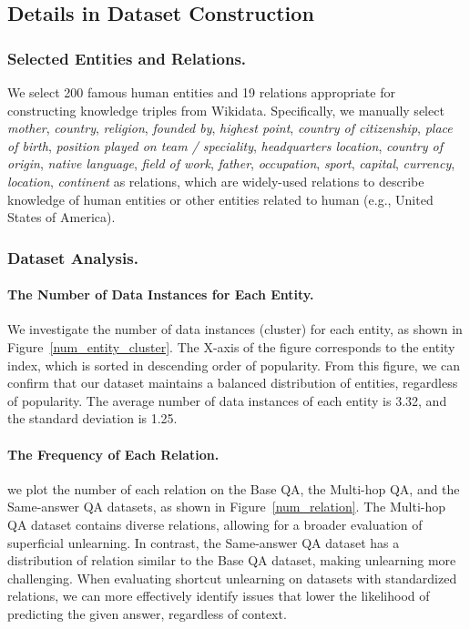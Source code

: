 





\subsection{Details in Dataset Construction}



\subsubsection{Selected Entities and Relations.}
\label{apx:relations}
We select 200 famous human entities and 19 relations appropriate for constructing knowledge triples from Wikidata.
Specifically, we manually select \textit{mother}, \textit{country}, \textit{religion}, \textit{founded by}, \textit{highest point}, \textit{country of citizenship}, \textit{place of birth}, \textit{position played on team / speciality}, \textit{headquarters location}, \textit{country of origin}, \textit{native language}, \textit{field of work}, \textit{father}, \textit{occupation}, \textit{sport}, \textit{capital}, \textit{currency}, \textit{location}, \textit{continent} as relations, which are widely-used relations to describe knowledge of human entities or other entities related to human (e.g., United States of America).


\subsubsection{Dataset Analysis.}

\paragraph{The Number of Data Instances for Each Entity.}
We investigate the number of data instances (cluster) for each entity, as shown in Figure~\ref{num_entity_cluster}.
The X-axis of the figure corresponds to the entity index, which is sorted in descending order of popularity.
From this figure, we can confirm that our dataset maintains a balanced distribution of entities, regardless of popularity.
The average number of data instances of each entity is 3.32, and the standard deviation is 1.25.




\paragraph{The Frequency of Each Relation.}
we plot the number of each relation on the Base QA, the Multi-hop QA, and the Same-answer QA datasets, as shown in Figure~\ref{num_relation}.
The Multi-hop QA dataset contains diverse relations, allowing for a broader evaluation of superficial unlearning.
In contrast, the Same-answer QA dataset has a distribution of relation similar to the Base QA dataset, making unlearning more challenging.
When evaluating shortcut unlearning on datasets with standardized relations, we can more effectively identify issues that lower the likelihood of predicting the given answer, regardless of context.


